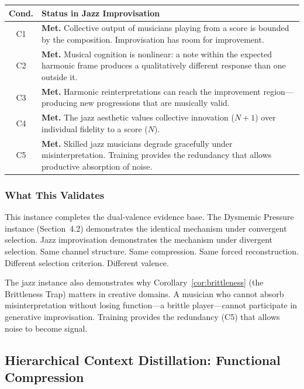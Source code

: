 \documentclass[12pt,letterpaper]{article}
\theoremstyle{definition}
\theoremstyle{remark}
\begin{document}
\begin{center}
\begin{tabular}{@{}cp{10cm}@{}}
\toprule
\textbf{Cond.} & \textbf{Status in Jazz Improvisation} \\
\midrule
C1 & \textbf{Met.} Collective output of musicians playing from a score is bounded by the composition. Improvisation has room for improvement. \\
C2 & \textbf{Met.} Musical cognition is nonlinear: a note within the expected harmonic frame produces a qualitatively different response than one outside it. \\
C3 & \textbf{Met.} Harmonic reinterpretations can reach the improvement region---producing new progressions that are musically valid. \\
C4 & \textbf{Met.} The jazz aesthetic values collective innovation ($N{+}1$) over individual fidelity to a score ($N$). \\
C5 & \textbf{Met.} Skilled jazz musicians degrade gracefully under misinterpretation. Training provides the redundancy that allows productive absorption of noise. \\
\bottomrule
\end{tabular}
\end{center}

\subsubsection{What This Validates}

This instance completes the dual-valence evidence base. The Dysmemic Pressure instance (Section~4.2) demonstrates the identical mechanism under convergent selection. Jazz improvisation demonstrates the mechanism under divergent selection. Same channel structure. Same compression. Same forced reconstruction. Different selection criterion. Different valence.

The jazz instance also demonstrates why Corollary~\ref{cor:brittleness} (the Brittleness Trap) matters in creative domains. A musician who cannot absorb misinterpretation without losing function---a brittle player---cannot participate in generative improvisation. Training provides the redundancy (C5) that allows noise to become signal.


\subsection{Hierarchical Context Distillation: Functional Compression}
\end{document}
